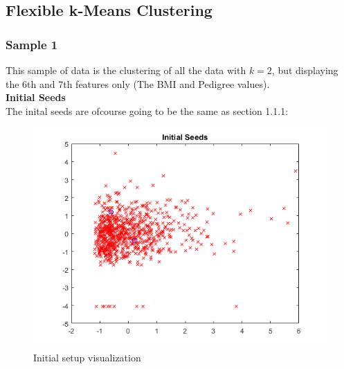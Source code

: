 \documentclass[12pt]{article}
\begin{document}
\newpage

\subsection{Flexible k-Means Clustering}
\subsubsection{Sample 1}
This sample of data is the clustering of all the data with $k=2$, but displaying the 6th and 7th features only (The BMI and Pedigree values).
\\[0.1 in]
\textbf{Initial Seeds}
\\[0.1 in]
The inital seeds are ofcourse going to be the same as section 1.1.1:
\begin{figure}[h!]
    \begin{center}
        \includegraphics[scale=1.2]{TQ2_a.png}
        \caption{Initial setup visualization}
    \end{center}
\end{figure}
\end{document}
